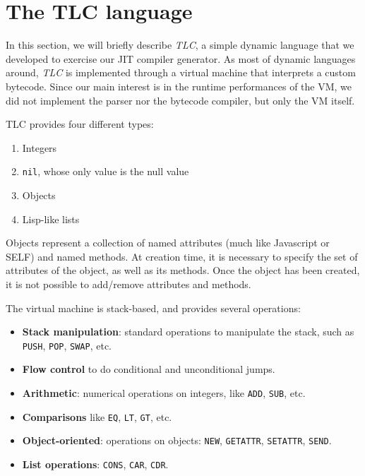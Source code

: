 \section{The TLC language}


In this section, we will briefly describe \emph{TLC}, a simple dynamic
language that we developed to exercise our JIT compiler generator.  As most of
dynamic languages around, \emph{TLC} is implemented through a virtual machine
that interprets a custom bytecode. Since our main interest is in the runtime
performances of the VM, we did not implement the parser nor the bytecode
compiler, but only the VM itself.

TLC provides four different types:
\begin{enumerate}
\item Integers
\item \lstinline{nil}, whose only value is the null value
\item Objects
\item Lisp-like lists
\end{enumerate}

Objects represent a collection of named attributes (much like Javascript or
SELF) and named methods.  At creation time, it is necessary to specify the set
of attributes of the object, as well as its methods.  Once the object has been
created, it is not possible to add/remove attributes and methods.

The virtual machine is stack-based, and provides several operations:

\begin{itemize}
\item \textbf{Stack manipulation}: standard operations to manipulate the
  stack, such as \lstinline{PUSH}, \lstinline{POP}, \lstinline{SWAP}, etc.
\item \textbf{Flow control} to do conditional and unconditional jumps.
\item \textbf{Arithmetic}: numerical operations on integers, like
  \lstinline{ADD}, \lstinline{SUB}, etc.
\item \textbf{Comparisons} like \lstinline{EQ}, \lstinline{LT},
  \lstinline{GT}, etc.
\item \textbf{Object-oriented}: operations on objects: \lstinline{NEW},
  \lstinline{GETATTR}, \lstinline{SETATTR}, \lstinline{SEND}.
\item \textbf{List operations}: \lstinline{CONS}, \lstinline{CAR},
  \lstinline{CDR}.
\end{itemize}

